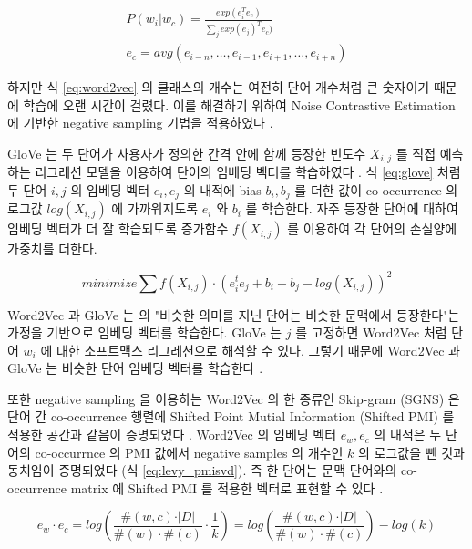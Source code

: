 \documentclass[oneside, ko,phd]{snuthesis_utf8_kor}
\begin{document}
\begin{equation}
  \label{eq:word2vec}
  \begin{aligned}
  P(w_i \vert w_c) = \frac{exp(e_i^T e_c)}{\sum_j exp(e_j)^T e_c)} \\
  e_c = avg(e_{i-n}, \dots, e_{i-1}, e_{i+1}, \dots, e_{i+n})
  \end{aligned}
\end{equation}

하지만 식 \ref{eq:word2vec} 의 클래스의 개수는 여전히 단어 개수처럼 큰 숫자이기 때문에 학습에 오랜 시간이 걸렸다.
이를 해결하기 위하여 Noise Contrastive Estimation \cite{gutmann2010noise} 에 기반한 negative sampling 기법을 적용하였다 \cite{mikolov2013distributed}.

GloVe 는 두 단어가 사용자가 정의한 간격 안에 함께 등장한 빈도수 $X_{i,j}$ 를 직접 예측하는 리그레션 모델을 이용하여 단어의 임베딩 벡터를 학습하였다 \cite{pennington2014glove}.
식 \ref{eq:glove} 처럼 두 단어 $i, j$ 의 임베딩 벡터 $e_i, e_j$ 의 내적에 bias $b_i, b_j$ 를 더한 값이 co-occurrence 의 로그값 $log(X_{i,j})$ 에 가까워지도록 $e_i$ 와 $b_i$ 를 학습한다.
자주 등장한 단어에 대하여 임베딩 벡터가 더 잘 학습되도록 증가함수 $f(X_{i,j})$ 를 이용하여 각 단어의 손실양에 가중치를 더한다.

\begin{equation}
  \label{eq:glove}
  minimize \sum f(X_{i,j}) \cdot \left( e_i^t e_j + b_i + b_j - log(X_{i,j}) \right)^2
\end{equation}

Word2Vec 과 GloVe 는 \cite{harris1954distributional} 의 "비슷한 의미를 지닌 단어는 비슷한 문맥에서 등장한다"는 가정을 기반으로 임베딩 벡터를 학습한다.
GloVe 는 $j$ 를 고정하면 Word2Vec 처럼 단어 $w_i$ 에 대한 소프트맥스 리그레션으로 해석할 수 있다.
그렇기 때문에 Word2Vec 과 GloVe 는 비슷한 단어 임베딩 벡터를 학습한다 \cite{levy2015improving}.

또한 negative sampling 을 이용하는 Word2Vec 의 한 종류인 Skip-gram (SGNS) 은 단어 간 co-occurrence 행렬에 Shifted Point Mutial Information (Shifted PMI) 를 적용한 공간과 같음이 증명되었다 \cite{levy2014neural}.
Word2Vec 의 임베딩 벡터 $e_w, e_c$ 의 내적은 두 단어의 co-occurrnce 의 PMI 값에서 negative samples 의 개수인 $k$ 의 로그값을 뺀 것과 동치임이 증명되었다 (식 \ref{eq:levy_pmisvd}).
즉 한 단어는 문맥 단어와의 co-occurrence matrix 에 Shifted PMI 를 적용한 벡터로 표현할 수 있다 \cite{levy2014neural}.

\begin{equation}
  \label{eq:levy_pmisvd}
  e_w \cdot e_c = log \left( \frac{\#(w,c) \cdot \vert D \vert}{\#(w) \cdot \#(c)} \cdot \frac{1}{k} \right) = log \left( \frac{\#(w,c) \cdot \vert D \vert}{\#(w) \cdot \#(c)} \right) - log(k)
\end{equation}
\end{document}
